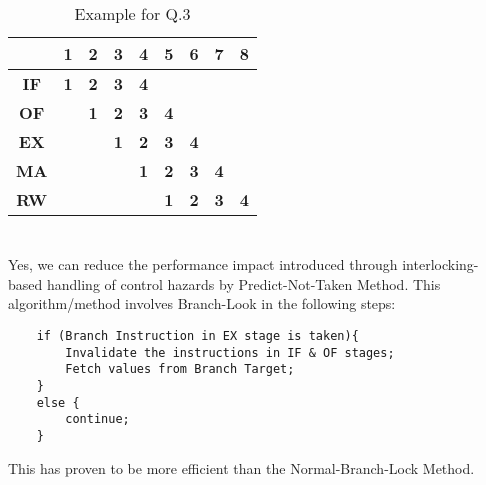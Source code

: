 \documentclass[12pt]{article}
\begin{document}
\begin{table}[]
\begin{center}
\begin{tabular}{|c|cccc|ccll}
\hline
\multicolumn{1}{|l|}{} & \multicolumn{1}{c|}{1}          & \multicolumn{1}{c|}{\textbf{2}} & \multicolumn{1}{c|}{\textbf{3}} & \textbf{4}                      & \multicolumn{1}{c|}{\textbf{5}} & \multicolumn{1}{c|}{\textbf{6}} & \multicolumn{1}{c|}{\textbf{7}} & \multicolumn{1}{c|}{\textbf{8}} \\ \hline
\textbf{IF}            & \multicolumn{1}{c|}{\textbf{1}} & \multicolumn{1}{c|}{\textbf{2}} & \multicolumn{1}{c|}{\textbf{3}} & \multicolumn{1}{l|}{\textbf{4}} & \multicolumn{1}{l}{}            & \multicolumn{1}{l}{}            &                                 &                                 \\ \cline{1-6}
\textbf{OF}            & \multicolumn{1}{c|}{}           & \multicolumn{1}{c|}{\textbf{1}} & \multicolumn{1}{c|}{\textbf{2}} & \textbf{3}                      & \multicolumn{1}{c|}{\textbf{4}} & \textbf{}                       &                                 &                                 \\ \cline{1-1} \cline{3-7}
\textbf{EX}            &                                 & \multicolumn{1}{c|}{}           & \multicolumn{1}{c|}{\textbf{1}} & \textbf{2}                      & \multicolumn{1}{c|}{\textbf{3}} & \multicolumn{1}{c|}{\textbf{4}} &                                 &                                 \\ \cline{1-1} \cline{4-8}
\textbf{MA}            &                                 &                                 & \multicolumn{1}{c|}{}           & \textbf{1}                      & \multicolumn{1}{c|}{\textbf{2}} & \multicolumn{1}{c|}{\textbf{3}} & \multicolumn{1}{c|}{\textbf{4}} &                                 \\ \cline{1-1} \cline{5-9} 
\textbf{RW}            &                                 &                                 &                                 & \multicolumn{1}{l|}{}           & \multicolumn{1}{c|}{\textbf{1}} & \multicolumn{1}{c|}{\textbf{2}} & \multicolumn{1}{c|}{\textbf{3}} & \multicolumn{1}{c|}{\textbf{4}} \\ \cline{1-1} \cline{6-9} 
\end{tabular}
    \end{center}
    \caption{Example for Q.3}
\end{table}
\section{}
Yes, we can  reduce the performance impact introduced through interlocking-based handling of control hazards by Predict-Not-Taken Method. This algorithm/method involves Branch-Look in the following steps:
\begin{verbatim}
    if (Branch Instruction in EX stage is taken){
        Invalidate the instructions in IF & OF stages;
        Fetch values from Branch Target;
    }
    else {
        continue;
    }
\end{verbatim}
This has proven to be more efficient than the Normal-Branch-Lock Method.
\end{document}
